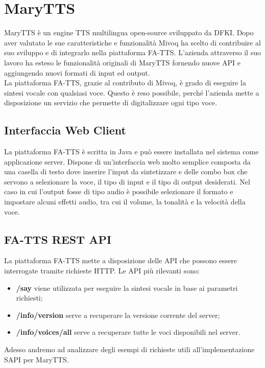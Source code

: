 \newpage
\section{MaryTTS}
MaryTTS è un engine TTS multilingua open-source sviluppato da DFKI. Dopo aver valutato le sue caratteristiche e funzionalità Mivoq ha scelto di contribuire al suo sviluppo e di integrarlo nella piattaforma FA-TTS.
L'azienda attraverso il suo lavoro ha esteso le funzionalità originali di MaryTTS fornendo nuove API e aggiungendo nuovi formati di input ed output.\\
La piattaforma FA-TTS, grazie al contributo di Mivoq, è grado di eseguire la sintesi vocale con qualsiasi voce. Questo è reso possibile, perché l'azienda mette a disposizione un servizio che permette di digitalizzare ogni tipo voce.
\subsection{Interfaccia Web Client}
La piattaforma FA-TTS è scritta in Java e può essere installata nel sistema come applicazione server.
Dispone di un'interfaccia web molto semplice composta da una casella di testo dove inserire l'input da sintetizzare e delle combo box che servono a selezionare la voce, il tipo di input e il tipo di output desiderati.
Nel caso in cui l'output fosse di tipo audio è possibile selezionare il formato e impostare alcuni effetti audio, tra cui il volume, la tonalità e la velocità della voce.
\subsection{FA-TTS REST API}
La piattaforma FA-TTS mette a disposizione delle API che possono essere interrogate tramite richieste HTTP.
Le API più rilevanti sono:
\begin{itemize}
	\item \textbf{/say} viene utilizzata per eseguire la sintesi vocale in base ai parametri richiesti;
	\item \textbf{/info/version} serve a recuperare la versione corrente del server;
	\item \textbf{/info/voices/all} serve a recuperare tutte le voci disponibili nel server.
\end{itemize}
Adesso andremo ad analizzare degli esempi di richieste utili all'implementazione SAPI per MaryTTS.
